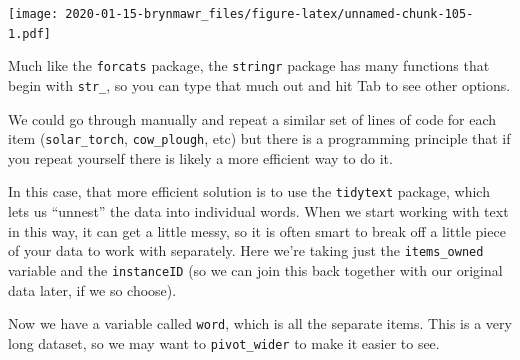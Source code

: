 \documentclass[]{book}
\newenvironment{Shaded}{\begin{snugshade}}{\end{snugshade}}
\newcommand{\KeywordTok}[1]{\textcolor[rgb]{0.13,0.29,0.53}{\textbf{#1}}}
\newcommand{\DataTypeTok}[1]{\textcolor[rgb]{0.13,0.29,0.53}{#1}}
\newcommand{\StringTok}[1]{\textcolor[rgb]{0.31,0.60,0.02}{#1}}
\newcommand{\OtherTok}[1]{\textcolor[rgb]{0.56,0.35,0.01}{#1}}
\newcommand{\OperatorTok}[1]{\textcolor[rgb]{0.81,0.36,0.00}{\textbf{#1}}}
\newcommand{\NormalTok}[1]{#1}
\begin{document}
\texttt{[image: 2020-01-15-brynmawr\_files/figure-latex/unnamed-chunk-105-1.pdf]}

Much like the \texttt{forcats} package, the \texttt{stringr} package has
many functions that begin with \texttt{str\_}, so you can type that much
out and hit Tab to see other options.

We could go through manually and repeat a similar set of lines of code
for each item (\texttt{solar\_torch}, \texttt{cow\_plough}, etc) but
there is a programming principle that if you repeat yourself there is
likely a more efficient way to do it.

In this case, that more efficient solution is to use the
\texttt{tidytext} package, which lets us ``unnest'' the data into
individual words. When we start working with text in this way, it can
get a little messy, so it is often smart to break off a little piece of
your data to work with separately. Here we're taking just the
\texttt{items\_owned} variable and the \texttt{instanceID} (so we can
join this back together with our original data later, if we so choose).

\begin{Shaded}
\end{Shaded}

\begin{Shaded}
\end{Shaded}

Now we have a variable called \texttt{word}, which is all the separate
items. This is a very long dataset, so we may want to
\texttt{pivot\_wider} to make it easier to see.

\begin{Shaded}
\end{Shaded}
\end{document}
